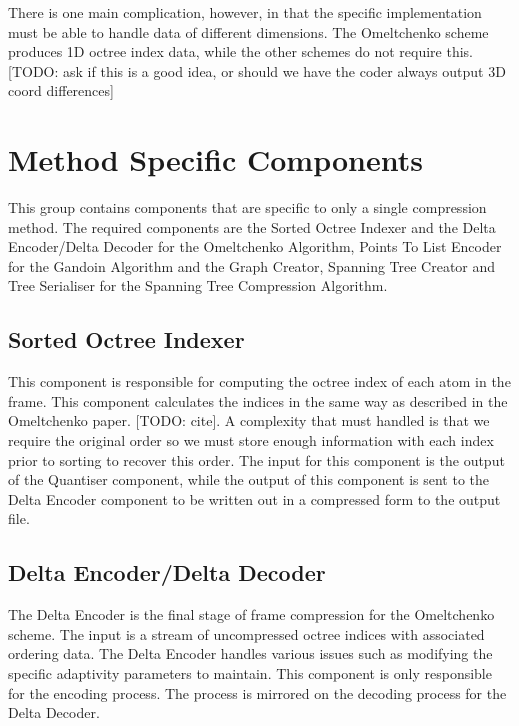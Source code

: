 \documentclass[a4paper,11pt]{report}
\begin{document}
There is one main complication, however, in that the specific implementation must be able to handle data of different dimensions. The Omeltchenko scheme produces 1D octree index data, while the other schemes do not require this. [TODO: ask if this is a good idea, or should we have the coder always output 3D coord differences]

\section{Method Specific Components}

This group contains components that are specific to only a single compression method. The required components are the Sorted Octree Indexer and the Delta Encoder/Delta Decoder for the Omeltchenko Algorithm,  Points To List Encoder for the Gandoin Algorithm and the Graph Creator, Spanning Tree Creator and Tree Serialiser for the Spanning Tree Compression Algorithm.

\subsection{Sorted Octree Indexer}

This component is responsible for computing the octree index of each atom in the frame. This component calculates the indices in the same way as described in the Omeltchenko paper. [TODO: cite]. A complexity that must handled is that we require the original order so we must store enough information with each index prior to sorting to recover this order. The input for this component is the output of the Quantiser component, while the output of this component is sent to the Delta Encoder component to be written out in a compressed form to the output file. 

\subsection{Delta Encoder/Delta Decoder}

The Delta Encoder is the final stage of frame compression for the Omeltchenko scheme. The input is a stream of uncompressed octree indices with associated ordering data. The Delta Encoder handles various issues such as modifying the specific adaptivity parameters to maintain. This component is only responsible for the encoding process. The process is mirrored on the decoding process for the Delta Decoder.
\end{document}
